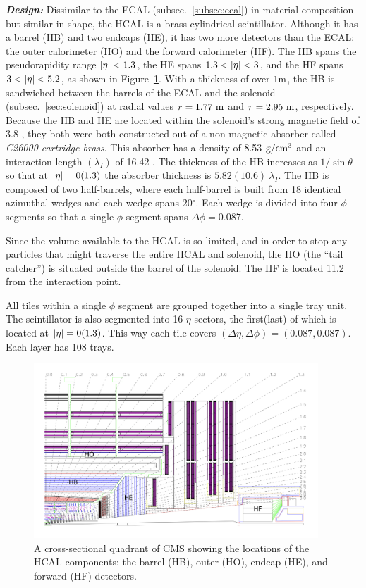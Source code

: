 \textit{\textbf{Design:}}
Dissimilar to the ECAL (subsec.~\ref{subsec:ecal}) in material composition but similar in shape, the HCAL is a brass cylindrical scintillator.
Although it has a barrel (HB) and two endcaps (HE), it has two more detectors than the ECAL: the outer calorimeter (HO) and the forward calorimeter (HF).
The HB spans the pseudorapidity range $\abseta < 1.3$, the HE spans $1.3 < \abseta < 3$, and the HF spans $3 < \abseta < 5.2$, as shown in Figure~\ref{fig:hcal_quadrant}.
With a thickness of over $1\meter$, the HB is sandwiched between the barrels of the ECAL and the solenoid (subsec.~\ref{sec:solenoid}) at radial values $r = 1.77~\meter$ and $r = 2.95~\meter$, respectively.
Because the HB and HE are located within the solenoid's strong magnetic field of 3.8 \tesla, they both were both constructed out of a non-magnetic absorber called \emph{C26000 cartridge brass}.
This absorber has a density of 8.53 $\gram/\cm^{3}$ and an interaction length $(\lambda_I)$ of 16.42 \cm.
The thickness of the HB increases as $1/\sin{\theta}$ so that at $\abseta = 0(1.3)$ the absorber thickness is $5.82(10.6)~\lambda_I$.
The HB is composed of two half-barrels, where each half-barrel is built from 18 identical azimuthal wedges and each wedge spans 20$^\circ$.
Each wedge is divided into four $\phi$ segments so that a single $\phi$ segment spans $\Delta \phi = 0.087$.

Since the volume available to the HCAL is so limited, and in order to stop any particles that might traverse the entire HCAL and solenoid, the HO (the ``tail catcher'') is situated outside the barrel of the solenoid.
The HF is located 11.2 \meter from the interaction point.

All tiles within a single $\phi$ segment are grouped together into a single tray unit.
The scintillator is also segmented into 16 $\eta$ sectors, the first(last) of which is located at $\abseta = 0(1.3)$.
This way each tile covers $(\Delta \eta, \Delta \phi) = (0.087, 0.087)$.
Each layer has 108 trays.

\begin{figure}[pbth]
    \centering
    \includegraphics[width=0.95\textwidth]{figures/cms/hcal/hcal_quadrants_longitudinalview.jpg}
    \caption{
        A cross-sectional quadrant of CMS showing the locations of the HCAL components:
        the barrel (HB), outer (HO), endcap (HE), and forward (HF) detectors.
        }
    \label{fig:hcal_quadrant}
\end{figure}

